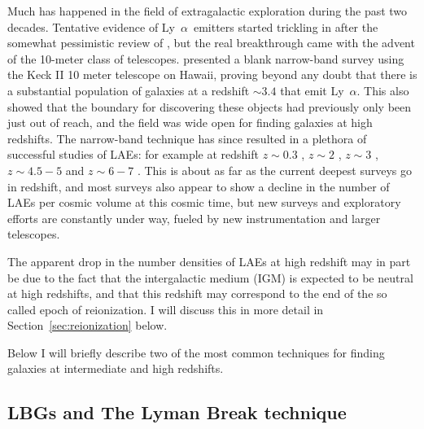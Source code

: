 \documentclass[a4wide,12pt]{book}
\newcommand{\lya}{Ly~${\alpha}$}
\begin{document}
{Much has happened in the field of extragalactic exploration during the past two decades. Tentative evidence of \lya\ emitters started trickling in after the somewhat pessimistic review of \citet{pritchet1994}, but the real breakthrough came with the advent of the 10-meter class of telescopes. \citet{cowie-hu1998} presented a blank narrow-band survey using the Keck II 10 meter telescope on Hawaii, proving beyond any doubt that there is a substantial population of galaxies at a redshift $\sim 3.4$ that emit \lya . This also showed that the boundary for discovering these objects had previously only been just out of reach, and the field was wide open for finding galaxies at high redshifts. The narrow-band technique has since resulted in a plethora of successful studies of LAEs: for example at redshift $z \sim 0.3$ \citep[e.g.][]{deharveng-2008}, $z \sim 2$ \citep[e.g.][]{nilsson-2009,guaita-2011}, $z \sim 3$ \citep[e.g.][]{gawiser-2006,gronwall-2007,nilsson-2007_3,ono-2010_3}, $z \sim 4.5-5$ \citep[e.g.][]{malhotra-rhoads2002,finkelstein-2008,pirzkal-2007,yuma-2010} and $z \sim 6-7$ \citep[e.g.][]{ono-2010_6,ouchi-2010,shibuya-2012}. 
This is about as far as the current deepest surveys go in redshift, and most surveys also appear to show a decline in the number of LAEs per cosmic volume at this cosmic time, but new surveys and exploratory efforts are constantly under way, fueled by new instrumentation and larger telescopes. 

The apparent drop in the number densities of LAEs at high redshift may in part be due to the fact that the intergalactic medium (IGM) is expected to be neutral at high redshifts, and that this redshift may correspond to the end of the so called epoch of reionization. I will discuss this in more detail in Section~\ref{sec:reionization} below.

Below I will briefly describe two of the most common techniques for finding galaxies at intermediate and high redshifts. 

\subsection{LBGs and The Lyman Break technique}

}
\end{document}
